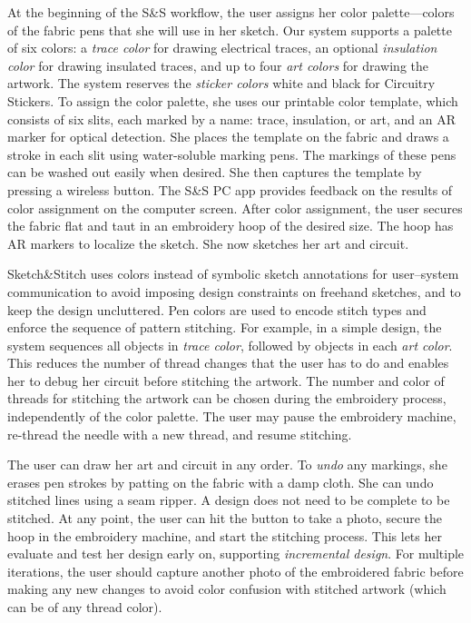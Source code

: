 \documentclass[header.tex]{subfiles}
\begin{document}
At the beginning of the S\&S workflow, the user assigns her color palette---colors of the fabric pens that she will use in her sketch. Our system supports a palette of six colors: a \textit{trace color} for drawing electrical traces, an optional \textit{insulation color} for drawing insulated traces, and up to four \textit{art colors} for drawing the artwork. The system reserves the \textit{sticker colors} white and black for Circuitry Stickers. To assign the color palette, she uses our printable color template, which consists of six slits, each marked by a name: trace, insulation, or art, and an AR marker for optical detection. She places the template on the fabric and draws a stroke in each slit using water-soluble marking pens. The markings of these pens can be washed out easily when desired. She then captures the template by pressing a wireless button. The S\&S PC app provides feedback on the results of color assignment on the computer screen. After color assignment, the user secures the fabric flat and taut in an embroidery hoop of the desired size. The hoop has AR markers to localize the sketch. She now sketches her art and circuit.

Sketch\&Stitch uses colors instead of symbolic sketch annotations for user--system communication to avoid imposing design constraints on freehand sketches, and to keep the design uncluttered. Pen colors are used to encode stitch types and enforce the sequence of pattern stitching. For example, in a simple design, the system sequences all objects in \textit{trace color}, followed by objects in each \textit{art color}. This reduces the number of thread changes that the user has to do and enables her to debug her circuit before stitching the artwork. %
The number and color of threads for stitching the artwork can be chosen during the embroidery process, independently of the color palette. The user may pause the embroidery machine, re-thread the needle with a new thread, and resume stitching. %


The user can draw her art and circuit in any order.
To \textit{undo} any markings, she erases pen strokes by patting on the fabric with a damp cloth. She can undo stitched lines using a seam ripper. A design does not need to be complete to be stitched. At any point, the user can hit the button to take a photo, secure the hoop in the embroidery machine, and start the stitching process. This lets her evaluate and test her design early on, supporting \textit{incremental design}. For multiple iterations, the user should capture another photo of the embroidered fabric before making any new changes to avoid color confusion with stitched artwork (which can be of any thread color).
\end{document}

